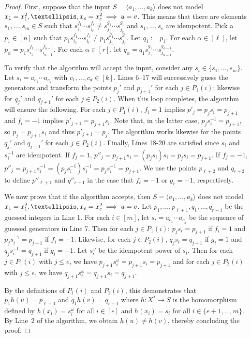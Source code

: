\documentclass{amsart}
\newcommand{\eq}{\ensuremath\mathrel{=}}
\theoremstyle{remark}
\numberwithin{equation}{section}
\begin{document}
\begin{proof}
  First, suppose that the input $S = \langle a_1,\dots,a_k\rangle$ does not model $x_1 \eq x_1^2,\dots,x_e \eq x_e^2 \implies u \eq v$. This means that there are elements $s_1,\dots,s_m \in S$ such that $s_{i_1}^{f_1}\cdots s_{i_\ell}^{f_\ell} \neq s_{j_1}^{g_1}\cdots s_{j_r}^{g_r}$ and $s_1,\dots,s_e$ are idempotent. Pick a $p_1 \in [n]$ such that $p_1 s_{i_1}^{f_1} \cdots s_{i_\ell}^{f_\ell} \neq p_1 s_{j_1}^{g_1} \cdots s_{j_r}^{g_r}$. Let $q_1 := p_1$. For each $\alpha \in [\ell]$, let $p_\alpha = p_1 s_{i_1}^{f_1} \cdots s_{i_{\alpha-1}}^{f_{\alpha-1}}$. For each $\alpha \in [r]$, let $q_\alpha = q_1 s_{j_1}^{g_1} \cdots s_{j_{\alpha-1}}^{g_{\alpha-1}}$.

  To verify that the algorithm will accept the input, consider any $s_i \in \{s_1,\dots,s_m\}$. Let $s_i = a_{c_1} \cdots a_{c_d}$ with $c_1, \dots, c_d \in [k]$. Lines 6--17 will successively guess the generators and transform the points $p_j'$ and $p_{j+1}'$ for each $j \in P_1(i)$; likewise for $q_j'$ and $q_{j+1}'$ for each $j \in P_2(i)$. When this loop completes, the algorithm will ensure the following. For each $j \in P_1(i)$, $f_i = 1$ implies $p'_j = p_js_i = p_{j+1}$ and $f_i = -1$ implies $p'_{j+1} = p_{j+1}s_i$. Note that, in the latter case, $p_js_i^{-1} = p_{j+1}$, so $p_j = p_{j+1}s_i$ and thus $p'_{j+1} = p_j$. The algorithm works likewise for the points $q_j'$ and $q_{j+1}'$ for each $j \in P_2(i)$. Finally, Lines 18-20 are satisfied since $s_i$ and $s_i^{-1}$ are idempotent. If $f_j = 1$, $p''_j = p_{j+1}s_i = (p_js_i)s_i = p_js_i = p_{j+1}$. If $f_j = -1$, $p''_j = p_{j+1}s^{-1}_i = (p_js^{-1}_i)s^{-1}_i = p_js^{-1}_i = p_{j+1}$. We use the points $p_{\ell+2}$ and $q_{r+2}$ to define $p''_{\ell+1}$ and $q''_{r+1}$ in the case that $f_\ell=-1$ or $g_r=-1$, respectively.
  
  We now prove that if the algorithm accepts, then $S = \langle a_1,\dots,a_k\rangle$ does not model $x_1 \eq x_1^2,\dots,x_e \eq x_e^2 \implies u \eq v$.
  Let $p_1,\dots,p_{\ell+1},q_1,\dots,q_{r+1}$ be the guessed integers in Line 1. For each $i \in [m]$, let $s_i = a_{c_1}\cdots a_{c_g}$ be the sequence of guessed generators in Line 7.
  Then for each $j \in P_1(i)$: $p_j s_i = p_{j+1}$ if $f_i=1$ and $p_j s_i^{-1} = p_{j+1}$ if $f_i = -1$. Likewise, for each $j \in P_2(i)$, $q_j s_i = q_{j+1}$ if $g_i=1$ and $q_j s_i^{-1} = q_{j+1}$ if $g_i=-1$. Let $s_i^\omega$ be the idempotent power of $s_i$. Then for each $j \in P_1(i)$ with $j \le e$, we have $p_{j+1}s_i^\omega = p_{j+1} s_i = p_{j+1}$ and for each $j \in P_2(i)$ with $j \le e$, we have $q_{j+1}s_i^\omega = q_{j+1} s_i = q_{j+1}$.
  
  By the definitions of $P_1(i)$ and $P_2(i)$, this demonstrates that $p_1 h(u) = p_{\ell+1}$ and $q_1 h(v) = q_{r+1}$ where $h \colon X^* \to S$ is the homomorphism defined by $h(x_i) = s_i^\omega$ for all $i \in [e]$ and $h(x_i) = s_i$ for all $i \in \{e+1,\dots,m\}$. By Line~2 of the algorithm, we obtain $h(u) \ne h(v)$, thereby concluding the proof.
\end{proof}
\end{document}
